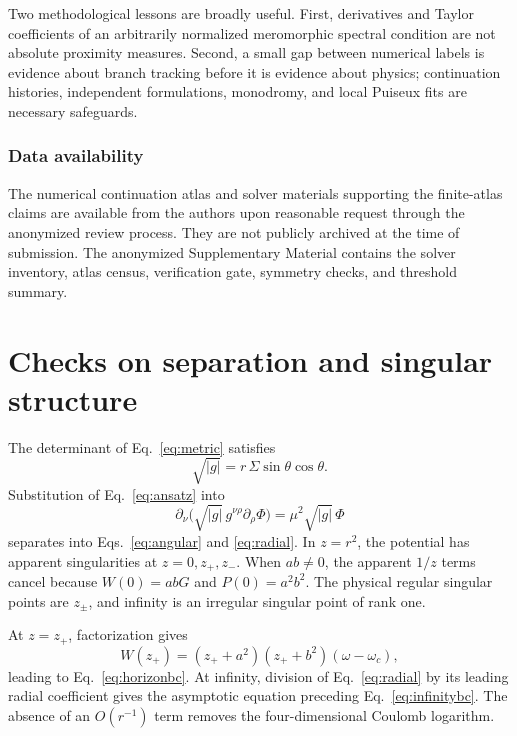 \documentclass[10pt]{article}
\theoremstyle{plain}
\begin{document}
Two methodological lessons are broadly useful. First, derivatives and Taylor
coefficients of an arbitrarily normalized meromorphic spectral condition are
not absolute proximity measures. Second, a small gap between numerical labels is
evidence about branch tracking before it is evidence about physics;
continuation histories, independent formulations, monodromy, and local Puiseux
fits are necessary safeguards.

\subsubsection*{Data availability}

The numerical continuation atlas and solver materials supporting the
finite-atlas claims are available from the authors upon reasonable request
through the anonymized review process. They are not publicly archived at the
time of submission. The anonymized Supplementary Material contains the solver
inventory, atlas census, verification gate, symmetry checks, and threshold
summary.




\appendix

\section{Checks on separation and singular structure}

The determinant of Eq.~\eqref{eq:metric} satisfies
\begin{equation}
\sqrt{|g|}=r\,\Sigma\sin\theta\cos\theta .
\end{equation}
Substitution of Eq.~\eqref{eq:ansatz} into
\begin{equation}
\partial_\nu\bigl(\sqrt{|g|}\,g^{\nu\rho}\partial_\rho\Phi\bigr)
=\mu^2\sqrt{|g|}\,\Phi
\end{equation}
separates into Eqs.~\eqref{eq:angular} and \eqref{eq:radial}. In $z=r^2$, the
potential has apparent singularities at $z=0,z_+,z_-$. When $ab\neq0$, the
apparent $1/z$ terms cancel because $W(0)=abG$ and $P(0)=a^2b^2$. The physical
regular singular points are $z_\pm$, and infinity is an irregular singular point
of rank one.

At $z=z_+$, factorization gives
\begin{equation}
W(z_+)=(z_++a^2)(z_++b^2)(\omega-\omega_c),
\end{equation}
leading to Eq.~\eqref{eq:horizonbc}. At infinity, division of
Eq.~\eqref{eq:radial} by its leading radial coefficient gives the asymptotic
equation preceding Eq.~\eqref{eq:infinitybc}. The absence of an $O(r^{-1})$ term
removes the four-dimensional Coulomb logarithm.
\end{document}
